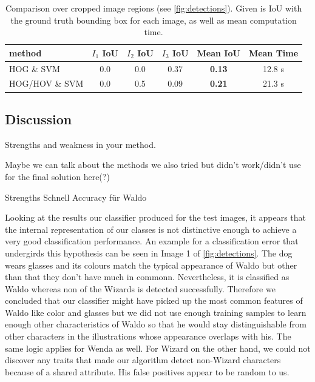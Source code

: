 \documentclass[11pt]{article}
\begin{document}
\begin{table}
    \centering
    \begin{tabular}{lccccc}
        \toprule
        method & \( I_1 \) IoU & \( I_2 \) IoU & \( I_3 \) IoU & Mean IoU & Mean Time \\
        \midrule
        HOG \& SVM              & 0.0   & 0.0 & 0.37 & \textbf{0.13} & 12.8 s \\
        HOG/HOV \& SVM          &  0.0  & 0.5 & 0.09 & \textbf{0.21} & 21.3 s \\
        \bottomrule
    \end{tabular}
    \caption{Comparison over cropped image regions (see \autoref{fig:detections}). Given is IoU with the ground truth bounding box for each image,
    as well as mean computation time.}
    \label{tab:class-iou}
\end{table}

\subsection{Discussion}
Strengths and weakness in your method.

Maybe we can talk about the methods we also tried but didn't work/didn't use for the final solution here(?)

Strengths
Schnell
Accuracy für Waldo


Looking at the results our classifier produced for the test images, it appears that the internal
representation of our classes is not distinctive enough to achieve a very good classification performance.
An example for a classification error that undergirds this hypothesis can be seen in Image 1 of
\autoref{fig:detections}. The dog wears glasses and its colours match the typical appearance of
Waldo but other than that they don't have much in commonn. Nevertheless, it is classified as Waldo
whereas non of the Wizards is detected successfully. Therefore we concluded that our classifier
might have picked up the most common features of Waldo like color and glasses but we did not use
enough training samples to learn enough other characteristics of Waldo so that he would stay
distinguishable from other characters in the illustrations whose appearance overlaps with his. The
same logic applies for Wenda as well. For Wizard on the other hand, we could not discover any
traits that made our algorithm detect non-Wizard characters because of a shared attribute. His
false positives appear to be random to us.
\end{document}
